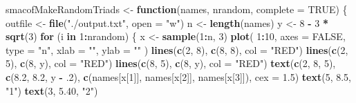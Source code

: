 \documentclass[
  12pt,
]{article}
\newenvironment{Shaded}{\begin{snugshade}}{\end{snugshade}}
\newcommand{\AttributeTok}[1]{\textcolor[rgb]{0.13,0.29,0.53}{#1}}
\newcommand{\ConstantTok}[1]{\textcolor[rgb]{0.56,0.35,0.01}{#1}}
\newcommand{\ControlFlowTok}[1]{\textcolor[rgb]{0.13,0.29,0.53}{\textbf{#1}}}
\newcommand{\DecValTok}[1]{\textcolor[rgb]{0.00,0.00,0.81}{#1}}
\newcommand{\FloatTok}[1]{\textcolor[rgb]{0.00,0.00,0.81}{#1}}
\newcommand{\FunctionTok}[1]{\textcolor[rgb]{0.13,0.29,0.53}{\textbf{#1}}}
\newcommand{\NormalTok}[1]{#1}
\newcommand{\OtherTok}[1]{\textcolor[rgb]{0.56,0.35,0.01}{#1}}
\newcommand{\SpecialCharTok}[1]{\textcolor[rgb]{0.81,0.36,0.00}{\textbf{#1}}}
\newcommand{\StringTok}[1]{\textcolor[rgb]{0.31,0.60,0.02}{#1}}
\begin{document}
\begin{Shaded}
\begin{Highlighting}[]
\NormalTok{smacofMakeRandomTriads }\OtherTok{\textless{}{-}}
  \ControlFlowTok{function}\NormalTok{(names, nrandom, }\AttributeTok{complete =} \ConstantTok{TRUE}\NormalTok{) \{}
\NormalTok{    outfile }\OtherTok{\textless{}{-}} \FunctionTok{file}\NormalTok{(}\StringTok{"./output.txt"}\NormalTok{, }\AttributeTok{open =} \StringTok{"w"}\NormalTok{)}
\NormalTok{    n }\OtherTok{\textless{}{-}} \FunctionTok{length}\NormalTok{(names)}
\NormalTok{    y }\OtherTok{\textless{}{-}} \DecValTok{8} \SpecialCharTok{{-}} \DecValTok{3} \SpecialCharTok{*} \FunctionTok{sqrt}\NormalTok{(}\DecValTok{3}\NormalTok{)}
    \ControlFlowTok{for}\NormalTok{ (i }\ControlFlowTok{in} \DecValTok{1}\SpecialCharTok{:}\NormalTok{nrandom) \{}
\NormalTok{      x }\OtherTok{\textless{}{-}} \FunctionTok{sample}\NormalTok{(}\DecValTok{1}\SpecialCharTok{:}\NormalTok{n, }\DecValTok{3}\NormalTok{)}
      \FunctionTok{plot}\NormalTok{(}
        \DecValTok{1}\SpecialCharTok{:}\DecValTok{10}\NormalTok{,}
        \AttributeTok{axes =} \ConstantTok{FALSE}\NormalTok{,}
        \AttributeTok{type =} \StringTok{"n"}\NormalTok{,}
        \AttributeTok{xlab =} \StringTok{""}\NormalTok{,}
        \AttributeTok{ylab =} \StringTok{""}
\NormalTok{      )}
      \FunctionTok{lines}\NormalTok{(}\FunctionTok{c}\NormalTok{(}\DecValTok{2}\NormalTok{, }\DecValTok{8}\NormalTok{), }\FunctionTok{c}\NormalTok{(}\DecValTok{8}\NormalTok{, }\DecValTok{8}\NormalTok{), }\AttributeTok{col =} \StringTok{"RED"}\NormalTok{)}
      \FunctionTok{lines}\NormalTok{(}\FunctionTok{c}\NormalTok{(}\DecValTok{2}\NormalTok{, }\DecValTok{5}\NormalTok{), }\FunctionTok{c}\NormalTok{(}\DecValTok{8}\NormalTok{, y), }\AttributeTok{col =} \StringTok{"RED"}\NormalTok{)}
      \FunctionTok{lines}\NormalTok{(}\FunctionTok{c}\NormalTok{(}\DecValTok{8}\NormalTok{, }\DecValTok{5}\NormalTok{), }\FunctionTok{c}\NormalTok{(}\DecValTok{8}\NormalTok{, y), }\AttributeTok{col =} \StringTok{"RED"}\NormalTok{)}
      \FunctionTok{text}\NormalTok{(}\FunctionTok{c}\NormalTok{(}\DecValTok{2}\NormalTok{, }\DecValTok{8}\NormalTok{, }\DecValTok{5}\NormalTok{), }\FunctionTok{c}\NormalTok{(}\FloatTok{8.2}\NormalTok{, }\FloatTok{8.2}\NormalTok{, y }\SpecialCharTok{{-}}\NormalTok{ .}\DecValTok{2}\NormalTok{),}
           \FunctionTok{c}\NormalTok{(names[x[}\DecValTok{1}\NormalTok{]], names[x[}\DecValTok{2}\NormalTok{]], names[x[}\DecValTok{3}\NormalTok{]]), }\AttributeTok{cex =} \FloatTok{1.5}\NormalTok{)}
      \FunctionTok{text}\NormalTok{(}\DecValTok{5}\NormalTok{, }\FloatTok{8.5}\NormalTok{, }\StringTok{"1"}\NormalTok{)}
      \FunctionTok{text}\NormalTok{(}\DecValTok{3}\NormalTok{, }\FloatTok{5.40}\NormalTok{, }\StringTok{"2"}\NormalTok{)}

\end{Highlighting}
\end{Shaded}
\end{document}
